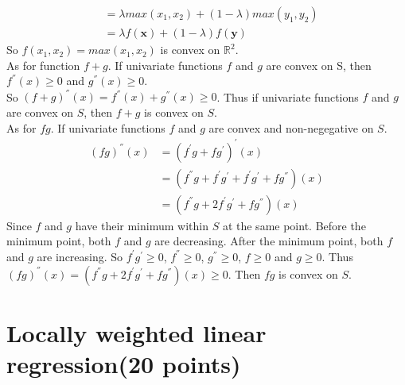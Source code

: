 \documentclass{article}
\begin{document}
\begin{itemize}
\begin{align*}
    &= \lambda max(x_{1}, x_{2}) + (1 - \lambda) max(y_{1}, y_{2})\\
    &= \lambda f(\bm{x}) + (1 - \lambda)f(\bm{y})
\end{align*}
So $f(x_{1}, x_{2}) = max(x_{1}, x_{2})$ is convex on $\mathbb{R}^2$.\\
As for function $f + g$. If univariate functions $f$ and $g$ are convex on S, then $ f^{''}(x) \geq 0$ and $ g^{''}(x)\geq 0$.\\
So $(f + g)^{''}(x) = f^{''}(x) + g^{''}(x) \geq 0$. Thus if univariate functions $f$ and $g$ are convex on $S$, then $f + g$ is convex on $S$.\\
As for $fg$. If univariate functions $f$ and $g$ are convex and non-negegative on $S$.
\begin{align*}
    (fg)^{''}(x) &= (f^{'}g + fg^{'})^{'}(x)\\
    &= (f^{''}g + f^{'}g^{'} + f^{'}g^{'} + fg^{''})(x)\\
    &= (f^{''}g + 2f^{'}g^{'} + f g^{''})(x)
\end{align*}
Since $f$ and $g$ have their minimum within $S$ at the same point. Before the minimum point, both $f$ and $g$ are decreasing. After the minimum point, both $f$ and $g$ are increasing. So $f^{'}g^{'} \geq 0$, $f^{''} \geq 0$, $g^{''} \geq 0$, $f\geq0$ and $g \geq 0$. Thus $(fg)^{''}(x) = (f^{''}g + 2f^{'}g^{'} + f g^{''})(x)\geq 0$. Then $fg$ is convex on $S$.
\end{itemize} 
\section{Locally weighted linear regression(20 points)}
\end{document}
